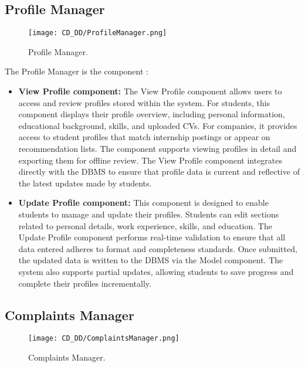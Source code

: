 \subsection{Profile Manager}
\label{subsec:profile_manager}%

\begin{figure}[H]
    \begin{center}
        \texttt{[image: CD\_DD/ProfileManager.png]}
        \caption{Profile Manager.}
        \label{fig:profile_manager}%
    \end{center}
\end{figure}

\noindent The Profile Manager is the component :

\begin{itemize}
    \item \textbf{View Profile component:} The View Profile component allows users to access and review profiles stored within the system. For students, this component displays their profile overview, including personal information, educational background, skills, and uploaded CVs. For companies, it provides access to student profiles that match internship postings or appear on recommendation lists. The component supports viewing profiles in detail and exporting them for offline review. The View Profile component integrates directly with the DBMS to ensure that profile data is current and reflective of the latest updates made by students.
    \item \textbf{Update Profile component:} This component is designed to enable students to manage and update their profiles. Students can edit sections related to personal details, work experience, skills, and education. The Update Profile component performs real-time validation to ensure that all data entered adheres to format and completeness standards. Once submitted, the updated data is written to the DBMS via the Model component. The system also supports partial updates, allowing students to save progress and complete their profiles incrementally.
\end{itemize}

\subsection{Complaints Manager}
\label{subsec:complaints_manager}%

\begin{figure}[H]
    \begin{center}
        \texttt{[image: CD\_DD/ComplaintsManager.png]}
        \caption{Complaints Manager.}
        \label{fig:complaints_manager}%
    \end{center}
\end{figure}

